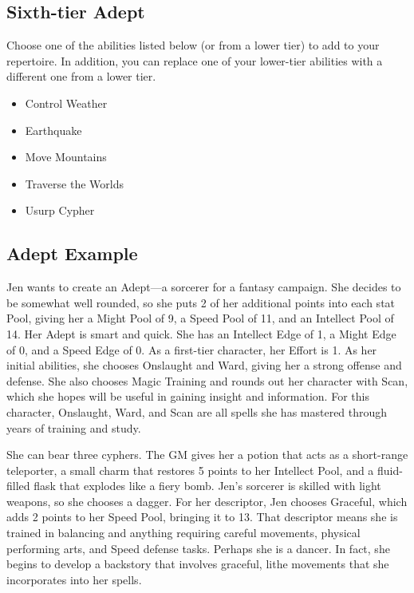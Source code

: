 \subsection{Sixth-tier Adept}

Choose one of the abilities listed below (or from a lower tier) to add to your repertoire. In addition, you can replace one of your lower-tier abilities with a different one from a lower tier.

\begin{itemize}
\item Control Weather
\item Earthquake
\item Move Mountains
\item Traverse the Worlds
\item Usurp Cypher
\end{itemize}

\subsection{Adept Example}

Jen wants to create an Adept—a sorcerer for a fantasy campaign. She decides to be somewhat well rounded, so she puts 2 of her additional points into each stat Pool, giving her a Might Pool of 9, a Speed Pool of 11, and an Intellect Pool of 14. Her Adept is smart and quick. She has an Intellect Edge of 1, a Might Edge of 0, and a Speed Edge of 0. As a first-tier character, her Effort is 1. As her initial abilities, she chooses Onslaught and Ward, giving her a strong offense and defense. She also chooses Magic Training and rounds out her character with Scan, which she hopes will be useful in gaining insight and information. For this character, Onslaught, Ward, and Scan are all spells she has mastered through years of training and study.

She can bear three cyphers. The GM gives her a potion that acts as a short-range teleporter, a small charm that restores 5 points to her Intellect Pool, and a fluid-filled flask that explodes like a fiery bomb. Jen’s sorcerer is skilled with light weapons, so she chooses a dagger. 
For her descriptor, Jen chooses Graceful, which adds 2 points to her Speed Pool, bringing it to 13. That descriptor means she is trained in balancing and anything requiring careful movements, physical performing arts, and Speed defense tasks. Perhaps she is a dancer. In fact, she begins to develop a backstory that involves graceful, lithe movements that she incorporates into her spells.

